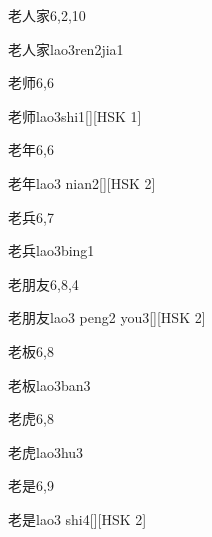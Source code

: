 \begin{entry}{老人家}{6,2,10}
  \begin{phonetics}{老人家}{lao3ren2jia1}
  \end{phonetics}
\end{entry}

\begin{entry}{老师}{6,6}
  \begin{phonetics}{老师}{lao3shi1}[][HSK 1]
  \end{phonetics}
\end{entry}

\begin{entry}{老年}{6,6}
  \begin{phonetics}{老年}{lao3 nian2}[][HSK 2]
  \end{phonetics}
\end{entry}

\begin{entry}{老兵}{6,7}
  \begin{phonetics}{老兵}{lao3bing1}
  \end{phonetics}
\end{entry}

\begin{entry}{老朋友}{6,8,4}
  \begin{phonetics}{老朋友}{lao3 peng2 you3}[][HSK 2]
  \end{phonetics}
\end{entry}

\begin{entry}{老板}{6,8}
  \begin{phonetics}{老板}{lao3ban3}
  \end{phonetics}
\end{entry}

\begin{entry}{老虎}{6,8}
  \begin{phonetics}{老虎}{lao3hu3}
  \end{phonetics}
\end{entry}

\begin{entry}{老是}{6,9}
  \begin{phonetics}{老是}{lao3 shi4}[][HSK 2]
  \end{phonetics}
\end{entry}

